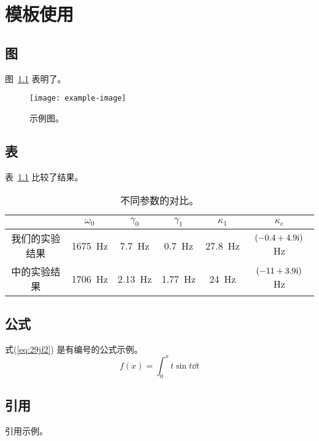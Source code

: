 \chapter{模板使用}
\zhlipsum[1-2]
\section{图}
图~\ref{fig:39:f020390} 表明了。
\begin{figure}[!htb]
    \centering
    \texttt{[image: example-image]}
    \caption{示例图。}
    \label{fig:39:f020390}
\end{figure}

\section{表}
表~\ref{tab:f20} 比较了结果。
\begin{table}[!htb]
    \centering
    \caption{不同参数的对比。}
    \begin{tabular}{cccccc}
        \toprule
         & $\omega_0$
         & $\gamma_0$
         & $\gamma_1$
         & $\kappa_1$
         & $\kappa_\mathrm{c}$
        \\
        \midrule
        我们的实验结果
         &
        1675~Hz
         &
        7.7~Hz
         &
        0.7~Hz
         &
        27.8~Hz
         &
        $\qty(-0.4+4.9\mathrm{i})$ Hz \\
        \cite{Zhong2020ReflectionAudioSounds}中的实验结果
         &
        1706~Hz
         &
        2.13~Hz
         &
        1.77~Hz
         &
        24~Hz
         &
        $\qty(-11+3.9\mathrm{i})$ Hz  \\
        \bottomrule
    \end{tabular}
    \label{tab:f20}
\end{table}


\section{公式}
式(\ref{eq:29jf2}) 是有编号的公式示例。
\begin{equation}
    f(x) = \int_0^x t\sin t \dd t
    \label{eq:29jf2}
\end{equation}

\section{引用}
引用示例\cite[图1]{Zhong2020InsertionLossThin}。

